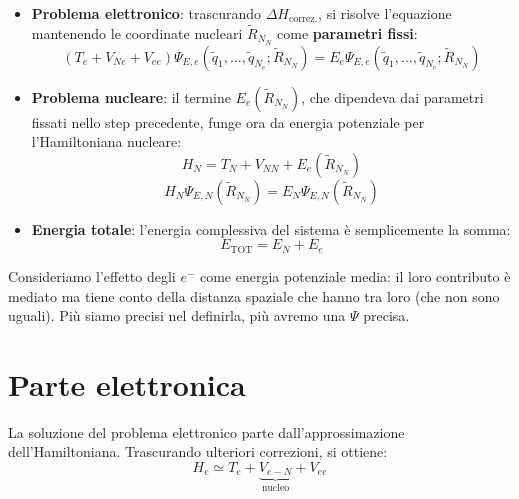 \begin{itemize}
    \item \textbf{Problema elettronico}: trascurando \(\Delta H_{\text{correz.}}\), si risolve l'equazione mantenendo le coordinate nucleari \(\tilde{R}_{N_N}\) come \textbf{parametri fissi}:
    \begin{equation}
        (T_e + V_{Ne} + V_{ee}) \Psi_{E,e}(\tilde{q}_1, \dots, \tilde{q}_{N_e} ; \tilde{R}_{N_N}) = E_e \Psi_{E,e}(\tilde{q}_1, \dots, \tilde{q}_{N_e} ; \tilde{R}_{N_N})
    \end{equation}

    \item \textbf{Problema nucleare}: il termine \(E_e(\tilde{R}_{N_N})\), che dipendeva dai parametri fissati nello step precedente, funge ora da energia potenziale per l'Hamiltoniana nucleare:
    \begin{equation}
        H_N = T_N + V_{NN} + E_e(\tilde{R}_{N_N})
    \end{equation}
    \begin{equation}
        H_N \Psi_{E,N}(\tilde{R}_{N_N}) = E_N \Psi_{E,N}(\tilde{R}_{N_N})
    \end{equation}

    \item \textbf{Energia totale}: l'energia complessiva del sistema è semplicemente la somma:
    \begin{equation}
        E_{\text{TOT}} = E_N + E_e
    \end{equation}
\end{itemize}

\begin{remark}
    Consideriamo l'effetto degli \(e^-\) come energia potenziale media: il loro contributo è mediato ma tiene conto della distanza spaziale che hanno tra loro (che non sono uguali). Più siamo precisi nel definirla, più avremo una \(\Psi\) precisa.
\end{remark}


\section{Parte elettronica}


La soluzione del problema elettronico parte dall'approssimazione dell'Hamiltoniana. Trascurando ulteriori correzioni, si ottiene:
\begin{equation}
    H_e \simeq T_e + \underbrace{V_{e-N}}_{\text{nucleo}} + V_{ee}
\end{equation}

